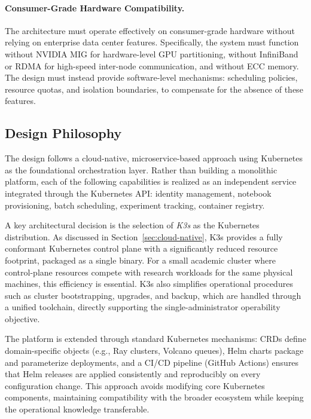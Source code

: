 \paragraph{Consumer-Grade Hardware Compatibility.} The architecture must operate effectively on consumer-grade hardware without relying on enterprise data center features. Specifically, the system must function without NVIDIA MIG for hardware-level GPU partitioning, without InfiniBand or RDMA for high-speed inter-node communication, and without ECC memory. The design must instead provide software-level mechanisms: scheduling policies, resource quotas, and isolation boundaries, to compensate for the absence of these features.

\subsection{Design Philosophy}

The design follows a cloud-native, microservice-based approach using Kubernetes as the foundational orchestration layer. Rather than building a monolithic platform, each of the following capabilities is realized as an independent service integrated through the Kubernetes API: identity management, notebook provisioning, batch scheduling, experiment tracking, container registry.

A key architectural decision is the selection of \emph{K3s} as the Kubernetes distribution. As discussed in Section~\ref{sec:cloud-native}, K3s provides a fully conformant Kubernetes control plane with a significantly reduced resource footprint, packaged as a single binary. For a small academic cluster where control-plane resources compete with research workloads for the same physical machines, this efficiency is essential. K3s also simplifies operational procedures such as cluster bootstrapping, upgrades, and backup, which are handled through a unified toolchain, directly supporting the single-administrator operability objective.

The platform is extended through standard Kubernetes mechanisms: CRDs define domain-specific objects (e.g., Ray clusters, Volcano queues), Helm charts package and parameterize deployments, and a CI/CD pipeline (GitHub Actions) ensures that Helm releases are applied consistently and reproducibly on every configuration change. This approach avoids modifying core Kubernetes components, maintaining compatibility with the broader ecosystem while keeping the operational knowledge transferable.
